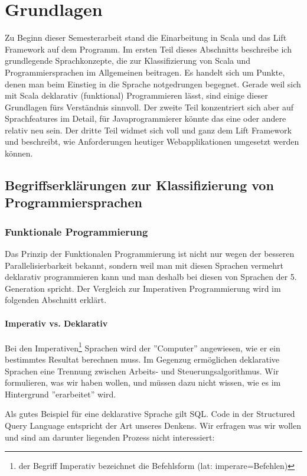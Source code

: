 \chapter{Grundlagen}\label{grundlagen}
Zu Beginn dieser Semesterarbeit stand die Einarbeitung in Scala und das Lift Framework auf dem Programm. Im ersten Teil dieses Abschnitts beschreibe ich grundlegende Sprachkonzepte, die zur Klassifizierung von Scala und Programmiersprachen im Allgemeinen beitragen. Es handelt sich um Punkte, denen man beim Einstieg in die Sprache notgedrungen begegnet. Gerade weil sich mit Scala deklarativ (funktional) Programmieren l\"asst, sind einige dieser Grundlagen f\"urs Verst\"andnis sinnvoll. Der zweite Teil konzentriert sich aber auf Sprachfeatures im Detail, f\"ur Javaprogrammierer k\"onnte das eine oder andere relativ neu sein. Der dritte Teil widmet sich voll und ganz dem Lift Framework und beschreibt, wie Anforderungen heutiger Webapplikationen umgesetzt werden k\"onnen.
\section{Begriffserkl\"arungen zur Klassifizierung von Programmiersprachen}
 \subsection{Funktionale Programmierung}
Das Prinzip der Funktionalen Programmierung ist nicht nur wegen der besseren Parallelisierbarkeit bekannt, sondern weil man mit diesen Sprachen vermehrt deklarativ programmieren kann und man deshalb bei diesen von Sprachen der 5. Generation spricht. Der Vergleich zur Imperativen Programmierung wird im folgenden Abschnitt erkl\"art.
\subsubsection{Imperativ vs. Deklarativ}\label{imperativ-deklarativ}
Bei den Imperativen\footnote{der Begriff Imperativ bezeichnet die Befehlsform (lat: imperare=Befehlen)} Sprachen wird der ''Computer'' angewiesen, wie er ein bestimmtes Resultat berechnen muss. Im Gegenzug erm\"oglichen deklarative Sprachen eine Trennung zwischen Arbeits- und Steuerungsalgorithmus. Wir formulieren, was wir haben wollen, und m\"ussen dazu nicht wissen, wie es im Hintergrund ''erarbeitet'' wird.

Als gutes Beispiel f\"ur eine deklarative Sprache gilt SQL. Code in der Structured Query Language entspricht der Art unseres Denkens. Wir erfragen was wir wollen und sind am darunter liegenden Prozess nicht interessiert:


